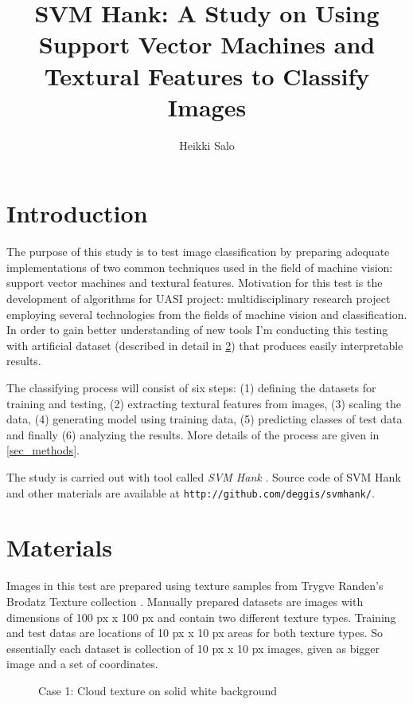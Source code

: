 \documentclass[11pt,twocolumn]{article}
\begin{document}
\title{SVM Hank: A Study on Using Support Vector Machines and Textural Features to Classify Images}
\author{Heikki Salo}

\maketitle

\section{Introduction}\label{introduction}

The purpose of this study is to test image classification by preparing
adequate implementations of two common techniques used in the field of
machine vision: support vector machines and textural features.
Motivation for this test is the development of algorithms for UASI project:
multidisciplinary research project employing several technologies from
the fields of machine vision and classification.
In order to gain better understanding of new tools I'm conducting this
testing with artificial dataset (described in detail in \ref{sec_materials})
that produces easily interpretable results.

The classifying process will consist of six steps:
(1) defining the datasets for training and testing,
(2) extracting textural features from images,
(3) scaling the data,
(4) generating model using training data,
(5) predicting classes of test data and finally
(6) analyzing the results.
More details of the process are given in \ref{sec_methods}.

The study is carried out with tool called \textit{SVM Hank} \cite{hank}.
Source code of SVM Hank and other materials are available at
\texttt{http://github.com/deggis/svmhank/}.


\section{Materials}\label{sec_materials}

Images in this test are prepared using texture samples from
Trygve Randen's Brodatz Texture collection \cite{brodatz}.
Manually prepared datasets are images with dimensions of
100 px x 100 px and contain two different texture types.
Training and test datas are locations of 10 px x 10 px areas
for both texture types.
So essentially each dataset is collection of 10 px x 10 px images,
given as bigger image and a set of coordinates.

\begin{figure}[htb]
\centering
\setlength\fboxsep{0pt}
\setlength\fboxrule{1pt}
\caption{Case 1: Cloud texture on solid white background}
\label{fig:level1}
\end{figure}
\end{document}
